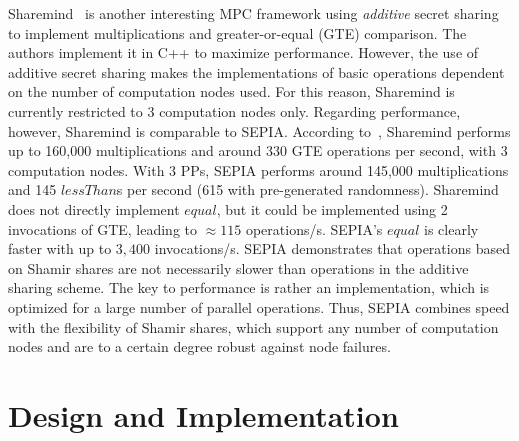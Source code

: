 \documentclass[letterpaper,11pt,onecolumn,titlepage]{article}
\begin{document}
Sharemind~\cite{Sharemind} is another interesting MPC framework using \emph{additive} secret sharing to implement multiplications and greater-or-equal (GTE) comparison. The authors implement it in C++ to maximize performance. However, the use of additive secret sharing makes the implementations of basic operations dependent on the number of computation nodes used. For this reason, Sharemind is currently restricted to $3$ computation nodes only. Regarding performance, however, Sharemind is comparable to SEPIA. According to~\cite{Sharemind}, Sharemind performs up to 160,000 multiplications and around 330 GTE operations per second, with 3 computation nodes. With 3 PPs, SEPIA performs around 145,000 multiplications and 145 $lessThan$s per second (615 with pre-generated randomness). Sharemind does not directly implement $equal$, but it could be implemented using 2 invocations of GTE, leading to $\approx 115$ operations/s. SEPIA's $equal$ is clearly faster with up to $3,400$ invocations/s.
SEPIA demonstrates that operations based on Shamir shares are not necessarily slower than operations in the additive sharing scheme. The key to performance is rather an implementation, which is optimized for a large number of parallel operations. Thus, SEPIA combines speed with the flexibility of Shamir shares, which support any number of computation nodes and are to a certain degree robust against node failures. 

\section{Design and Implementation}
\label{sec:design}
\lstset{language=Java,numbers=none,frame=single,basicstyle=\ttfamily\tiny,breaklines,tabsize=2,showstringspaces=false}
\end{document}
